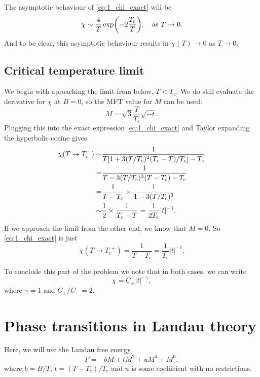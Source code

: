 \documentclass[11pt,letter, swedish, english
]{article}
\newcommand{\Tc}{\ensuremath{T_{\text{c}}}}
\begin{document}
The asymptotic behaviour of \eqref{eq:1_chi_exact} will be 
\begin{equation}
\chi\sim \frac{4}{T}\exp(-2\frac{\Tc}{T})
\qcomma \text{as}\ T\to0.
\end{equation}
And to be clear, this asymptotic behaviour results in $\chi(T)\to0$ as
$T\to0$. 


\subsection{Critical temperature limit}
We begin with aproaching the limit from below, $T<\Tc$. We do still
evaluate the derivative for $\chi$ at $B=0$, so the MFT value for $M$
can be used:
\begin{equation}
M=\sqrt{3}\frac{T}{\Tc}\sqrt{-t}.
\end{equation}
Plugging this into the exact expression \eqref{eq:1_chi_exact} and
Taylor expanding the hyperbolic cosine gives
\begin{equation}
\begin{aligned}
\chi(T\to\Tc^-)\sim&\frac{1}{T\qty[1+3(T/\Tc)^2(\Tc-T)/\Tc]-\Tc}\\
=&\frac{1}{T-3(T/\Tc)^3(T-\Tc) -\Tc}\\
=&\frac{1}{T-\Tc}\times\frac{1}{1-3(T/\Tc)^3}\\
\sim&\frac{1}{2}\times\frac{1}{\Tc-T}=\frac{1}{2\Tc}|t|^{-1}.
\end{aligned}
\end{equation}
If we approach the limit from the other end, we know that $M=0$. So
\eqref{eq:1_chi_exact} is just
\begin{equation}
\chi(T\to\Tc^+)=\frac{1}{T-\Tc}=\frac{1}{\Tc} |t|^{-1}.
\end{equation}

To conclude this part of the problem we note that in both cases, we
can write
\begin{equation}
\chi=C_\pm |t|^{-\gamma},
\end{equation}
where $\gamma=1$ and $C_+/C_-=2$.



\section{Phase transitions in Landau theory}
\renewcommand{\thesubsection}{\arabic{section} (\alph{subsection})}
\renewcommand{\thesubsubsection}{\arabic{section} (\alph{subsection},\,\roman{subsubsection})}

Here, we will use the Landau free energy
\begin{equation}\label{eq:2_F(M)}
F=-bM+tM^2+uM^4+M^6,
\end{equation}
where $b=B/T$, $t=(T-\Tc)/\Tc$ and $u$ is some coefiicient with no
restrictions. 
\end{document}
